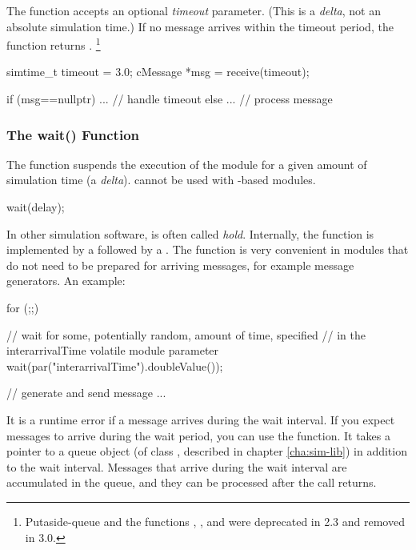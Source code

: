 The  function accepts an optional \textit{timeout}
parameter. (This is a \textit{delta}, not an
absolute simulation time.) If no message arrives within the timeout
period, the function returns .
    \footnote{Putaside-queue and the functions ,
    , and  were deprecated
    in {\opp} 2.3 and removed in {\opp} 3.0.}

\begin{cpp}
simtime_t timeout = 3.0;
cMessage *msg = receive(timeout);

if (msg==nullptr) {
    ...   // handle timeout
}
else {
    ...  // process message
}
\end{cpp}

\subsubsection{The wait() Function}
\label{sec:simple-modules:wait}

The  function suspends the execution of the module for a
given amount of simulation time (a \textit{delta}).  cannot
be used with -based modules.

\begin{cpp}
wait(delay);
\end{cpp}

In other simulation software,  is often called \textit{hold}.
Internally, the  function is implemented by a
 followed by a .
The  function is very convenient in modules that do not need
to be prepared for arriving messages, for example message generators.
An example:

\begin{cpp}
for (;;) {
    // wait for some, potentially random, amount of time, specified
    // in the interarrivalTime volatile module parameter
    wait(par("interarrivalTime").doubleValue());

    // generate and send message
    ...
}
\end{cpp}

It is a runtime error if a message arrives during the wait interval.
If you expect messages to arrive during the wait period, you can
use the  function. It takes a pointer to a queue object
(of class , described in chapter \ref{cha:sim-lib})
in addition to the wait interval. Messages that arrive during the
wait interval are accumulated in the queue, and they can be
processed after the  call returns.

